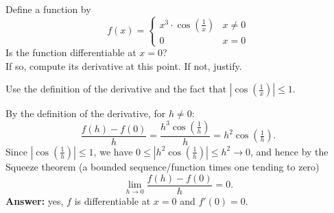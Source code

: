 
\begin{question}
Define a function by
\[ f(x) = \begin{cases} x^3\cdot\cos(\frac1x) & x \neq 0 \\ 0 & x = 0 \end{cases} \]
Is the function differentiable at $x = 0$? \\
If so, compute its derivative at this point. If not, justify.
\end{question}

\begin{hint}
Use the definition of the derivative and the fact that $|\cos(\frac1x)| \le 1$.
\end{hint}

\begin{solution}
By the definition of the derivative, for $h \neq 0$:
\[ \frac{f(h) - f(0)}{h} = \frac{h^3\cos(\frac1h)}{h} = h^2\cos\left(\tfrac1h\right). \]
Since $|\cos(\frac1h)| \le 1$, we have $0 \le \left|h^2\cos(\frac1h)\right| \le h^2 \to 0$, and hence by the Squeeze theorem (a bounded sequence/function times one tending to zero)
\[ \lim_{h\to 0}\frac{f(h) - f(0)}{h} = 0. \]
\textbf{Answer:} yes, $f$ is differentiable at $x=0$ and $f'(0) = 0$.
\end{solution}

